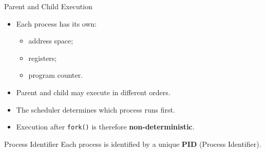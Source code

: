 \begin{frame}{Parent and Child Execution}

\begin{itemize}
    \item Each process has its own:
    \begin{itemize}
        \item address space;
        \item registers;
        \item program counter.
    \end{itemize}

    \item Parent and child may execute in different orders.
    \item The scheduler determines which process runs first.
    \item Execution after \texttt{fork()} is therefore
          \textbf{non-deterministic}.
\end{itemize}

\vspace{0.3cm}

\begin{block}{Process Identifier}
Each process is identified by a unique \textbf{PID}
(Process Identifier).
\end{block}

\end{frame}

